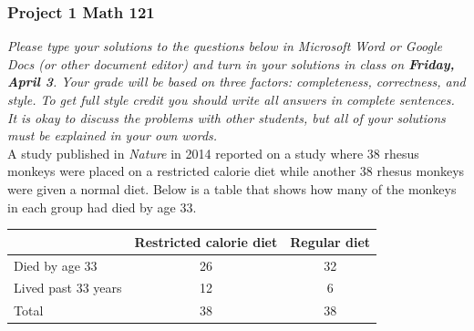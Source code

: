 \documentclass[12pt]{article}
\begin{document}
\subsubsection*{Project 1 \hfill Math 121}

\textit{Please type your solutions to the questions below in Microsoft Word or Google Docs (or other document editor) and turn in your solutions in class on \textbf{Friday, April 3}. Your grade will be based on three factors: completeness, correctness, and style. To get full style credit you should write all answers in complete sentences. It is okay to discuss the problems with other students, but all of your solutions must be explained in your own words. }  \\


A study published in \emph{Nature} in 2014 reported on a study where 38 rhesus monkeys were placed on a restricted calorie diet while another 38 rhesus monkeys were given a normal diet.  Below is a table that shows how many of the monkeys in each group had died by age 33.

\begin{center}
\begin{tabular}{l|c|c}
~ & Restricted calorie diet & Regular diet \\ \hline
Died by age 33 & 26 & 32 \\
Lived past 33 years & 12 & 6 \\ \hline
Total & 38 & 38
\end{tabular}
\end{center}
\end{document}
